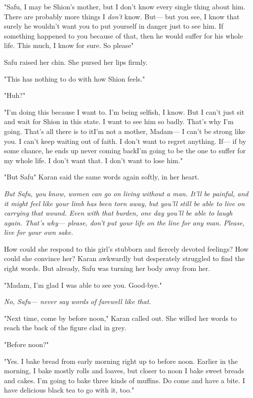 "Safu, I may be Shion's mother, but I don't know every single thing
about him. There are probably more things I \emph{don't} know. But--- but you
see, I know that surely he wouldn't want you to put yourself in danger
just to see him. If something happened to you because of that, then he
would suffer for his whole life. This much, I know for sure. So
please\el "

Safu raised her chin. She pursed her lips firmly.

"This has nothing to do with how Shion feels."

"Huh?"

"I'm doing this because I want to. I'm being selfish, I know. But I
can't just sit and wait for Shion in this state. I want to see him so
badly. That's why I'm going. That's all there is to it\el I'm not a
mother, Madam--- I can't be strong like you. I can't keep waiting out of
faith. I don't want to regret anything. If--- if by some chance, he ends
up never coming back\el I'm going to be the one to suffer for my whole
life. I don't want that. I don't want to lose him."

"But Safu\el " Karan said the same words again softly, in her heart.

\emph{But Safu, you know, women can go on living without a man. It'll be
painful, and it might feel like your limb has been torn away, but you'll
still be able to live on carrying that wound. Even with that burden, one
day you'll be able to laugh again. That's why--- please, don't put your
life on the line for any man. Please, live for your own sake.}

How could she respond to this girl's stubborn and fiercely devoted
feelings? How could she convince her? Karan awkwardly but desperately
struggled to find the right words. But already, Safu was turning her
body away from her.

"Madam, I'm glad I was able to see you. Good-bye."

\emph{No, Safu--- never say words of farewell like that.}

"Next time, come by before noon," Karan called out. She willed her words
to reach the back of the figure clad in grey.

"Before noon?"

"Yes. I bake bread from early morning right up to before noon. Earlier
in the morning, I bake mostly rolls and loaves, but closer to noon I
bake sweet breads and cakes. I'm going to bake three kinds of muffins.
Do come and have a bite. I have delicious black tea to go with it, too."

